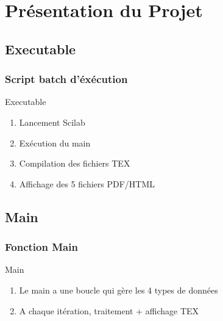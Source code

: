 \documentclass{beamer}
\begin{document}

\section{Présentation du Projet}

\subsection{ Executable}
\begin{frame}[label=Executable]
\frametitle{Script batch d'éxécution}
\begin{beamerboxesrounded}[shadow=true]{Executable}
		\begin{enumerate}
			\item Lancement Scilab 
			\item Exécution du main
			\item Compilation des fichiers TEX
			\item Affichage des 5 fichiers PDF/HTML
		\end{enumerate}
\end{beamerboxesrounded}
\end{frame}


\subsection{ Main}
\begin{frame}[label=Main]
\frametitle{Fonction Main}
\begin{beamerboxesrounded}[shadow=true]{Main}
		\begin{enumerate}
			\item Le main a une boucle qui gère les 4 types de données
			\item A chaque itération, traitement + affichage TEX	
		\end{enumerate}
\end{beamerboxesrounded}
\end{frame}
\end{document}
